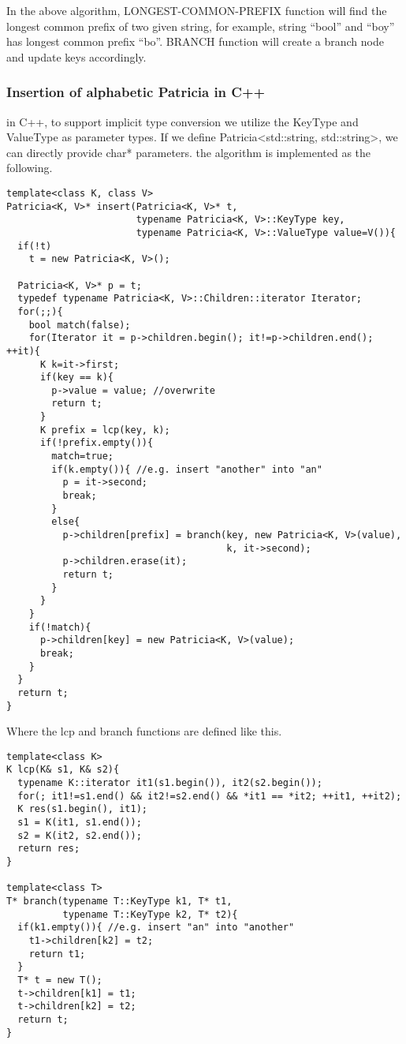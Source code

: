 \documentclass{article}
\begin{document}
In the above algorithm, LONGEST-COMMON-PREFIX function will find the longest
common prefix of two given string, for example, string ``bool'' and ``boy''
has longest common prefix ``bo''. BRANCH function will create a branch node
and update keys accordingly.

\subsubsection*{Insertion of alphabetic Patricia in C++}
in C++, to support implicit type conversion we utilize the KeyType and
ValueType as parameter types. If we define Patricia<std::string,
std::string>, we can directly provide char* parameters. the algorithm
is implemented as the following.

\lstset{language=C++}
\begin{lstlisting}
template<class K, class V>
Patricia<K, V>* insert(Patricia<K, V>* t,
                       typename Patricia<K, V>::KeyType key,
                       typename Patricia<K, V>::ValueType value=V()){
  if(!t)
    t = new Patricia<K, V>();

  Patricia<K, V>* p = t;
  typedef typename Patricia<K, V>::Children::iterator Iterator;
  for(;;){
    bool match(false);
    for(Iterator it = p->children.begin(); it!=p->children.end(); ++it){
      K k=it->first;
      if(key == k){
        p->value = value; //overwrite
        return t;
      }
      K prefix = lcp(key, k);
      if(!prefix.empty()){
        match=true;
        if(k.empty()){ //e.g. insert "another" into "an"
          p = it->second;
          break;
        }
        else{
          p->children[prefix] = branch(key, new Patricia<K, V>(value),
                                       k, it->second);
          p->children.erase(it);
          return t;
        }
      }
    }
    if(!match){
      p->children[key] = new Patricia<K, V>(value);
      break;
    }
  }
  return t;
}
\end{lstlisting}

Where the lcp and branch functions are defined like this.

\begin{lstlisting}
template<class K>
K lcp(K& s1, K& s2){
  typename K::iterator it1(s1.begin()), it2(s2.begin());
  for(; it1!=s1.end() && it2!=s2.end() && *it1 == *it2; ++it1, ++it2);
  K res(s1.begin(), it1);
  s1 = K(it1, s1.end());
  s2 = K(it2, s2.end());
  return res;
}

template<class T>
T* branch(typename T::KeyType k1, T* t1,
          typename T::KeyType k2, T* t2){
  if(k1.empty()){ //e.g. insert "an" into "another"
    t1->children[k2] = t2;
    return t1;
  }
  T* t = new T();
  t->children[k1] = t1;
  t->children[k2] = t2;
  return t;
}
\end{lstlisting}
\end{document}
